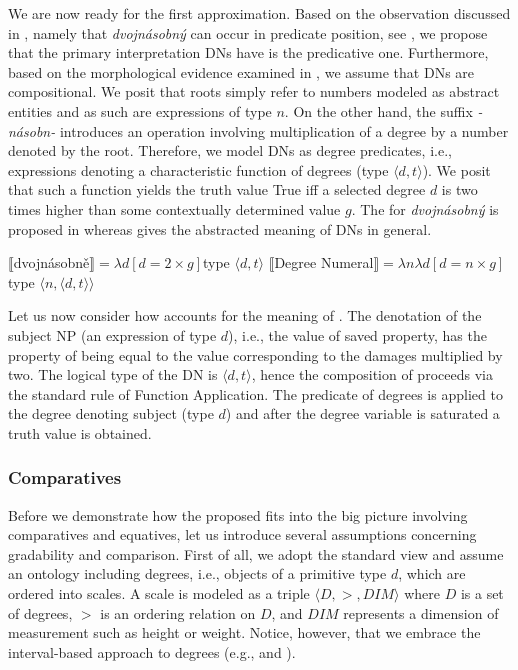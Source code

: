 \documentclass[output=paper,modfonts,hidelinks,newtxmath
\ChapterDOI{10.5281/zenodo.2545513}
]{langscibook}
\begin{document}
We are now ready for the first approximation. Based on the observation discussed in , namely that \textit{dvojnásobný} can occur in predicate position, see , we propose that the primary interpretation DNs have is the predicative one. Furthermore, based on the morphological evidence examined in , we assume that  DNs are compositional. We posit that  roots simply refer to numbers modeled as abstract entities and as such are expressions of type $n$. On the other hand, the suffix \textit{-násobn-} introduces an operation involving multiplication of a degree by a number denoted by the root. Therefore, we model DNs as degree predicates, i.e., expressions denoting a characteristic function of degrees (type $\langle d,t\rangle$). We posit that such a function yields the truth value True iff a selected degree $d$ is two times higher than some contextually determined value $g$. The  for \textit{dvojnásobný} is proposed in  whereas  gives the abstracted meaning of DNs in general.

\ea\label{degree-num-semantics}
\ea $\llbracket$dvojnásobně$\rrbracket = \lambda d[d = 2 \times g]$\hfill{type $\langle d,t\rangle$}\label{degree-num-semantics-dvojnasobne}
\ex $\llbracket$Degree Numeral$\rrbracket = \lambda n\lambda d[d = n \times g]$\hfill{type $\langle n,\langle d,t\rangle\rangle$}\label{degree-num-semantics-abstract}
\z \z

\noindent Let us now consider how  accounts for the meaning of . The denotation of the subject NP (an expression of type $d$), i.e., the value of saved property, has the property of being equal to the value corresponding to the damages multiplied by two. The logical type of the DN is $\langle d,t\rangle$, hence the composition of  proceeds via the standard rule of Function Application. The predicate of degrees is applied to the degree denoting subject (type $d$) and after the degree variable is saturated a truth value is obtained.

\subsubsection{Comparatives}\label{comparatives}

Before we demonstrate how the proposed  fits into the big picture involving comparatives and equatives, let us introduce several assumptions concerning gradability and comparison. First of all, we adopt the standard view and assume an ontology including degrees, i.e., objects of a primitive type $d$, which are ordered into scales. A scale is modeled as a triple $\langle D, >, DIM\rangle$ where $D$ is a set of degrees, $>$ is an ordering relation on $D$, and $DIM$ represents a dimension of measurement such as height or weight. Notice, however, that we embrace the interval-based approach to degrees (e.g., \citealt{kennedy2001polar} and \citealt{schwarzschild_wilkinson2002quantifiers}).
\end{document}
